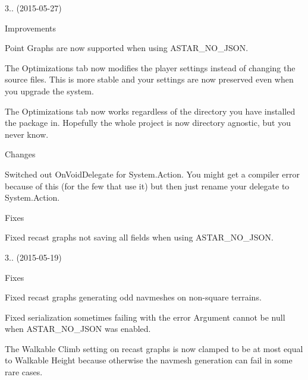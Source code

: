 \begin{DoxyItemize}
\begin{DoxyItemize}
\begin{DoxyItemize}
\end{DoxyItemize}
\end{DoxyItemize}
\item 3.. (2015-\/05-\/27)
\begin{DoxyItemize}
\item Improvements
\begin{DoxyItemize}
\item Point Graphs are now supported when using A\+S\+T\+A\+R\+\_\+\+N\+O\+\_\+\+J\+S\+ON.
\item The Optimizations tab now modifies the player settings instead of changing the source files. This is more stable and your settings are now preserved even when you upgrade the system.
\item The Optimizations tab now works regardless of the directory you have installed the package in. Hopefully the whole project is now directory agnostic, but you never know.
\end{DoxyItemize}
\item Changes
\begin{DoxyItemize}
\item Switched out On\+Void\+Delegate for System.\+Action. You might get a compiler error because of this (for the few that use it) but then just rename your delegate to System.\+Action.
\end{DoxyItemize}
\item Fixes
\begin{DoxyItemize}
\item Fixed recast graphs not saving all fields when using A\+S\+T\+A\+R\+\_\+\+N\+O\+\_\+\+J\+S\+ON.
\end{DoxyItemize}
\end{DoxyItemize}
\item 3.. (2015-\/05-\/19)
\begin{DoxyItemize}
\item Fixes
\begin{DoxyItemize}
\item Fixed recast graphs generating odd navmeshes on non-\/square terrains.
\item Fixed serialization sometimes failing with the error \textquotesingle{}Argument cannot be null\textquotesingle{} when A\+S\+T\+A\+R\+\_\+\+N\+O\+\_\+\+J\+S\+ON was enabled.
\item The \textquotesingle{}Walkable Climb\textquotesingle{} setting on recast graphs is now clamped to be at most equal to \textquotesingle{}Walkable Height\textquotesingle{} because otherwise the navmesh generation can fail in some rare cases.

\end{DoxyItemize}
\end{DoxyItemize}
\end{DoxyItemize}
